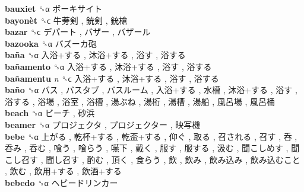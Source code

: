 \textbf{bauxiet} ␝α   ボーキサイト   \\
\textbf{bayonèt} ␝ϲ   牛蒡剣 ,  銃剣 ,  銃槍   \\
\textbf{bazar} ␝ϲ   デパート ,  バザー ,  バザール   \\
\textbf{bazooka} ␝α   バズーカ砲   \\
\textbf{baña} ␝α   入浴+する ,  沐浴+する ,  浴す ,  浴する   \\
\textbf{bañamento} ␝α   入浴+する ,  沐浴+する ,  浴す ,  浴する   \\
\textbf{bañamentu} \emph{n}  ␝ϲ   入浴+する ,  沐浴+する ,  浴す ,  浴する   \\
\textbf{baño} ␝α   バス ,  バスタブ ,  バスルーム ,  入浴+する ,  水槽 ,  沐浴+する ,  浴す ,  浴する ,  浴場 ,  浴室 ,  浴槽 ,  湯ぶね ,  湯桁 ,  湯槽 ,  湯船 ,  風呂場 ,  風呂桶   \\
\textbf{beach} ␝α   ビーチ ,  砂浜   \\
\textbf{beamer} ␝α   プロジェクタ ,  プロジェクター ,  映写機   \\
\textbf{bebe} ␝α   上がる ,  乾杯+する ,  乾盃+する ,  仰ぐ ,  取る ,  召される ,  召す ,  呑 ,  呑み ,  呑む ,  喰う ,  喰らう ,  嚥下 ,  戴く ,  服す ,  服する ,  汲む ,  聞こしめす ,  聞こし召す ,  聞し召す ,  酌む ,  頂く ,  食らう ,  飲 ,  飲み ,  飲み込み ,  飲み込むこと ,  飲む ,  飲用+する ,  飲酒+する   \\
\textbf{bebedo} ␝α   ヘビードリンカー   \\
